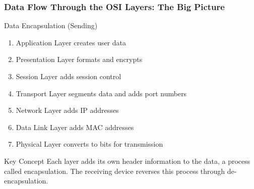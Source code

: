 \documentclass{beamer}
\begin{document}
\begin{frame}
    \frametitle{Data Flow Through the OSI Layers: The Big Picture}
    
    \begin{block}{Data Encapsulation (Sending)}
        \begin{enumerate}
            \item Application Layer creates user data
            \item Presentation Layer formats and encrypts
            \item Session Layer adds session control
            \item Transport Layer segments data and adds port numbers
            \item Network Layer adds IP addresses
            \item Data Link Layer adds MAC addresses
            \item Physical Layer converts to bits for transmission
        \end{enumerate}
    \end{block}
    
    \begin{alertblock}{Key Concept}
        Each layer adds its own header information to the data, a process called encapsulation. The receiving device reverses this process through de-encapsulation.
    \end{alertblock}
\end{frame}
\end{document}
